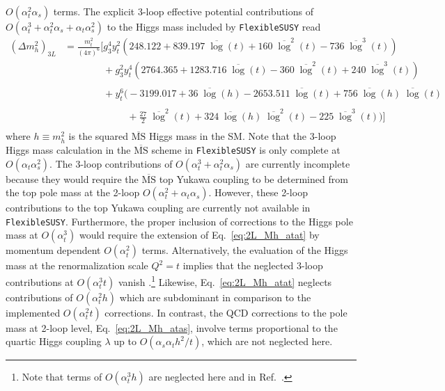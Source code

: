 \documentclass[final,3p,11pt,pdflatex]{elsarticle}
\makeatletter
\newcommand{\fs}{\texttt{FlexibleSUSY}\@\xspace}
\newcommand{\fsbreak}{\texttt{Flex\-ib\-le\-SUSY}\@\xspace}
\newcommand{\ol}[1]{\overline{#1}}
\newcommand{\MSbar}{\ensuremath{\ol{\text{MS}}}\xspace}
\newcommand{\barlog}{\overline{\log}}
\def\at{\alpha_t}
\def\as{\alpha_s}
\makeatother
\begin{document}
$O(\at^2\as)$ terms.
%
The explicit 3-loop effective potential contributions of
$O(\at^3 + \at^2 \as + \at \as^2)$ to the
Higgs mass included by \fs read
%
\begin{align}
  (\Delta m_h^2)_{3L} &=
  \frac{m_t^2}{(4\pi)^6} \Bigg[
     g_3^4 y_t^2 \left(248.122 + 839.197 \;\barlog(t) + 160 \;\barlog^2(t) - 736 \;\barlog^3(t)\right) \nonumber \\
     &\phantom{=\frac{m_t^2}{(4\pi)^6} \Bigg[}
     + g_3^2 y_t^4 \left(2764.365 + 1283.716 \;\barlog(t) - 360 \;\barlog^2(t) + 240 \;\barlog^3(t)\right) \nonumber \\
     &\phantom{=\frac{m_t^2}{(4\pi)^6} \Bigg[}
     + y_t^6 \Big(-3199.017 + 36 \;\barlog(h) - 2653.511 \;\barlog(t) + 756 \;\barlog(h) \;\barlog(t) \nonumber \\
     &\phantom{=\frac{m_t^2}{(4\pi)^6} \Bigg[}\qquad~~
     + \frac{27}{2} \;\barlog^2(t) + 324 \;\barlog(h) \;\barlog^2(t) - 225 \;\barlog^3(t)\Big)
  \Bigg]
\end{align}
%
where $h\equiv m_h^2$ is the squared \MSbar Higgs mass in the SM\@.
Note that the 3-loop Higgs mass calculation in
the \MSbar scheme in \fsbreak is only complete at $O(\at\as^2)$.  The
3-loop contributions of $O(\at^3 + \at^2 \as)$ are currently incomplete
because they would require the \MSbar top Yukawa coupling to be determined
from the top pole mass at the 2-loop $O(\at^2 + \at\as)$.
However, these 2-loop contributions to the top Yukawa coupling are
currently not available in \fs. Furthermore, the proper inclusion of
corrections to the Higgs pole mass at $O(\at^3)$
would require the extension of Eq.~\eqref{eq:2L_Mh_atat} by momentum
dependent $O(\at^2)$ terms. Alternatively, the evaluation of the Higgs mass at
the renormalization scale $Q^2 = t$ implies that the neglected
3-loop contributions at $O(\at^3 t)$ vanish
\cite{Martin:2014cxa}.\footnote{Note that terms of $O(\at^3 h)$ are
  neglected here and in Ref.\ \cite{Martin:2014cxa}.}
Likewise, Eq.~\eqref{eq:2L_Mh_atat} neglects contributions of $O(\at^2h)$ which are
subdominant in comparison to the implemented $O(\at^2t)$ corrections.
In contrast, the QCD corrections to the pole mass at 2-loop level, Eq.~\eqref{eq:2L_Mh_atas}, involve
terms proportional to the quartic Higgs coupling $\lambda$ up to $O(\as\at h^2/t)$, which are not
neglected here.
\end{document}
